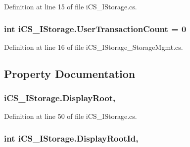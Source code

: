 Definition at line 15 of file i\+C\+S\+\_\+\+I\+Storage.\+cs.

\hypertarget{classi_c_s___i_storage_a32542c2e4bb1f0c40135a537b503a2d2}{
\subsubsection[{User\+Transaction\+Count}]{\setlength{\rightskip}{0pt plus 5cm}int i\+C\+S\+\_\+\+I\+Storage.\+User\+Transaction\+Count = 0}}\label{classi_c_s___i_storage_a32542c2e4bb1f0c40135a537b503a2d2}


Definition at line 16 of file i\+C\+S\+\_\+\+I\+Storage\+\_\+\+Storage\+Mgmt.\+cs.



\subsection{Property Documentation}
\hypertarget{classi_c_s___i_storage_ab9fac25f77fb67e6f6e6e540228cca91}{
\subsubsection[{Display\+Root}]{ i\+C\+S\+\_\+\+I\+Storage.\+Display\+Root\hspace{0.3cm}{\ttfamily [get]}, {\ttfamily [set]}}}\label{classi_c_s___i_storage_ab9fac25f77fb67e6f6e6e540228cca91}


Definition at line 50 of file i\+C\+S\+\_\+\+I\+Storage.\+cs.

\hypertarget{classi_c_s___i_storage_ac44bf00e5dfe4f3061a398833b8d7f7b}{
\subsubsection[{Display\+Root\+Id}]{\setlength{\rightskip}{0pt plus 5cm}int i\+C\+S\+\_\+\+I\+Storage.\+Display\+Root\+Id\hspace{0.3cm}{\ttfamily [get]}, {\ttfamily [set]}}}\label{classi_c_s___i_storage_ac44bf00e5dfe4f3061a398833b8d7f7b}



